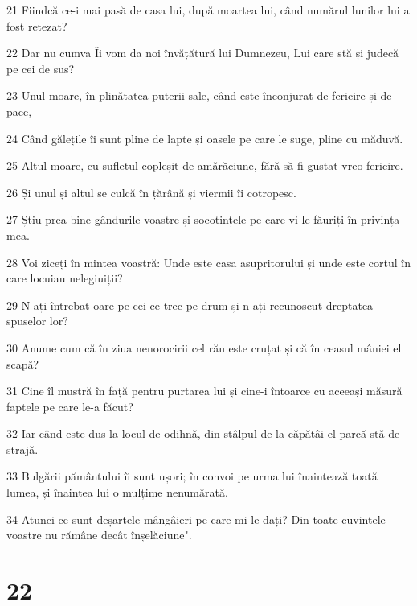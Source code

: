 \par 21 Fiindcă ce-i mai pasă de casa lui, după moartea lui, când numărul lunilor lui a fost retezat?
\par 22 Dar nu cumva Îi vom da noi învățătură lui Dumnezeu, Lui care stă și judecă pe cei de sus?
\par 23 Unul moare, în plinătatea puterii sale, când este înconjurat de fericire și de pace,
\par 24 Când gălețile îi sunt pline de lapte și oasele pe care le suge, pline cu măduvă.
\par 25 Altul moare, cu sufletul copleșit de amărăciune, fără să fi gustat vreo fericire.
\par 26 Și unul și altul se culcă în țărână și viermii îi cotropesc.
\par 27 Știu prea bine gândurile voastre și socotințele pe care vi le făuriți în privința mea.
\par 28 Voi ziceți în mintea voastră: Unde este casa asupritorului și unde este cortul în care locuiau nelegiuiții?
\par 29 N-ați întrebat oare pe cei ce trec pe drum și n-ați recunoscut dreptatea spuselor lor?
\par 30 Anume cum că în ziua nenorocirii cel rău este cruțat și că în ceasul mâniei el scapă?
\par 31 Cine îl mustră în față pentru purtarea lui și cine-i întoarce cu aceeași măsură faptele pe care le-a făcut?
\par 32 Iar când este dus la locul de odihnă, din stâlpul de la căpătâi el parcă stă de strajă.
\par 33 Bulgării pământului îi sunt ușori; în convoi pe urma lui înaintează toată lumea, și înaintea lui o mulțime nenumărată.
\par 34 Atunci ce sunt deșartele mângâieri pe care mi le dați? Din toate cuvintele voastre nu rămâne decât înșelăciune".

\chapter{22}

